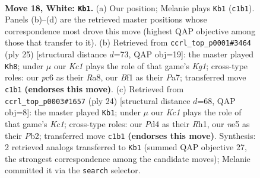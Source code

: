\documentclass[11pt]{article}
\begin{document}
\clearpage

\begin{figure}[p]\centering
\begin{subfigure}{0.46\textwidth}\centering
\resizebox{\linewidth}{!}{%
\newchessgame
\chessboard[
  setfen={rnb3kr/1p6/2p1p3/p2pn1qp/N2P4/6P1/PPP2NQP/2KR1B1R w - - 3 18},
  showmover=false,
  pgfstyle=straightmove, color=movearrow, markmove={c1-b1}
]}
\caption{}
\end{subfigure}\hfill
\begin{subfigure}{0.46\textwidth}\centering
\resizebox{\linewidth}{!}{%
\newchessgame
\chessboard[
  setfen={r4rk1/pppbqppp/3p1n2/8/2P1P2P/2N1QP2/PP3P2/2KR1B1R b - - 0 13},
  showmover=false,
  pgfstyle=straightmove, color=movearrow, markmove={g8-h8}
]}
\caption{}
\end{subfigure}
\\[4pt]
\begin{subfigure}{0.46\textwidth}\centering
\resizebox{\linewidth}{!}{%
\newchessgame
\chessboard[
  setfen={r3k2r/pp2ppb1/2qp1np1/7p/4P3/2N1BP2/PPPQ2PP/2KR3R w kq - 0 13},
  showmover=false,
  pgfstyle=straightmove, color=movearrow, markmove={c1-b1}
]}
\caption{}
\end{subfigure}\hfill

\caption{\textbf{Move 18, White: \texttt{Kb1}.} (a) Our position; Melanie plays \texttt{Kb1} (\texttt{c1b1}). Panels (b)--(d) are the retrieved master positions whose correspondence most drove this move (highest QAP objective among those that transfer to it). (b) Retrieved from \texttt{ccrl\_top\_p0001\#3464} (ply 25) [structural distance $d$=73, QAP obj=19]: the master played \texttt{Kh8}; under $\mu$ our \emph{Kc1} plays the role of that game's \emph{Kg1}; cross-type roles: our \emph{p}c6 as their \emph{R}a8, our \emph{B}f1 as their \emph{P}a7; transferred move \texttt{c1b1} \textbf{(endorses this move)}. (c) Retrieved from \texttt{ccrl\_top\_p0003\#1657} (ply 24) [structural distance $d$=68, QAP obj=8]: the master played \texttt{Kb1}; under $\mu$ our \emph{Kc1} plays the role of that game's \emph{Kc1}; cross-type roles: our \emph{P}d4 as their \emph{R}h1, our \emph{n}e5 as their \emph{P}b2; transferred move \texttt{c1b1} \textbf{(endorses this move)}. Synthesis: 2 retrieved analogs transferred to \texttt{Kb1} (summed QAP objective 27, the strongest correspondence among the candidate moves); Melanie committed it via the \texttt{search} selector.}
\label{fig:thought-m34}
\end{figure}

\clearpage
\end{document}
